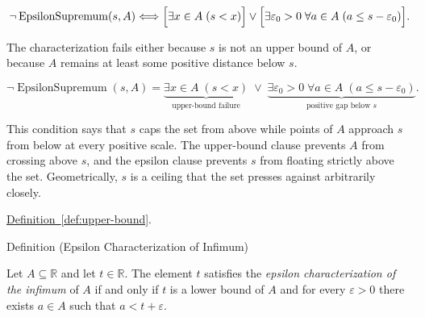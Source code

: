 \begin{remark*}
\[
\neg\operatorname{EpsilonSupremum}(s,A)\Longleftrightarrow
\Bigl[\exists x\in A\;(s<x)\Bigr]
\lor
\Bigl[\exists \varepsilon_0>0\;\forall a\in A\;(a\le s-\varepsilon_0)\Bigr].
\]
\end{remark*}

\begin{remark*}
The characterization fails either because $s$ is not an upper bound of $A$, or because $A$ remains at least some positive distance below $s$.
\end{remark*}

\begin{remark*}
\[
\neg\operatorname{EpsilonSupremum}(s,A)
=
\underbrace{\exists x\in A\;(s<x)}_{\text{upper-bound failure}}
\;\lor\;
\underbrace{\exists \varepsilon_0>0\;\forall a\in A\;(a\le s-\varepsilon_0)}_{\text{positive gap below }s}.
\]
\end{remark*}

\begin{remark*}[Interpretation]
This condition says that $s$ caps the set from above while points of $A$ approach $s$ from below at every positive scale. The upper-bound clause prevents $A$ from crossing above $s$, and the epsilon clause prevents $s$ from floating strictly above the set. Geometrically, $s$ is a ceiling that the set presses against arbitrarily closely.
\end{remark*}

\begin{remark*}[Dependencies]
\hyperref[def:upper-bound]{Definition~\ref*{def:upper-bound}}.
\end{remark*}






















\begin{definitionbox}{Definition (Epsilon Characterization of Infimum)}
\begin{definition}
\label{def:epsilon-characterization-of-infimum}
Let $A\subseteq\mathbb{R}$ and let $t\in\mathbb{R}$. The element $t$ satisfies the \emph{epsilon characterization of the infimum} of $A$ if and only if $t$ is a lower bound of $A$ and for every $\varepsilon>0$ there exists $a\in A$ such that $a<t+\varepsilon$.
\end{definition}
\end{definitionbox}

